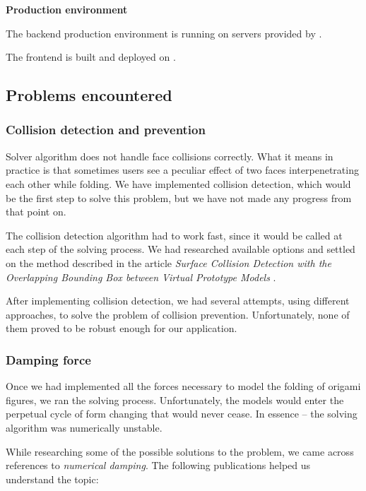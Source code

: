 \textbf{Production environment}

The backend production environment is running on servers provided by .

\medskip
The frontend is built and deployed on .


\subsection{Problems encountered}
\subsubsection{Collision detection and prevention}

Solver algorithm does not handle face collisions correctly.
What it means in practice is that sometimes users see a peculiar effect 
of two faces interpenetrating each other while folding.
We have implemented collision detection, which would be the first step to solve this problem,
but we have not made any progress from that point on. 

The collision detection algorithm had to work fast, since it would be called at each step of the solving process. 
We had researched available options and settled on the method described in the article
\textit{Surface Collision Detection with the Overlapping Bounding Box between Virtual Prototype Models} \cite{collision-detection}.

After implementing collision detection, we had several attempts, using different approaches, to 
solve the problem of collision prevention. Unfortunately, none of them proved to be robust enough for our application.

\subsubsection{Damping force}

Once we had implemented all the forces necessary to model the folding of origami figures, we ran the solving process.
Unfortunately, the models would enter the perpetual cycle of form changing that would never cease.
In essence -- the solving algorithm was numerically unstable.

While researching some of the possible solutions to the problem, 
we came across references to \textit{numerical damping}. 
The following publications helped us understand the topic: 

